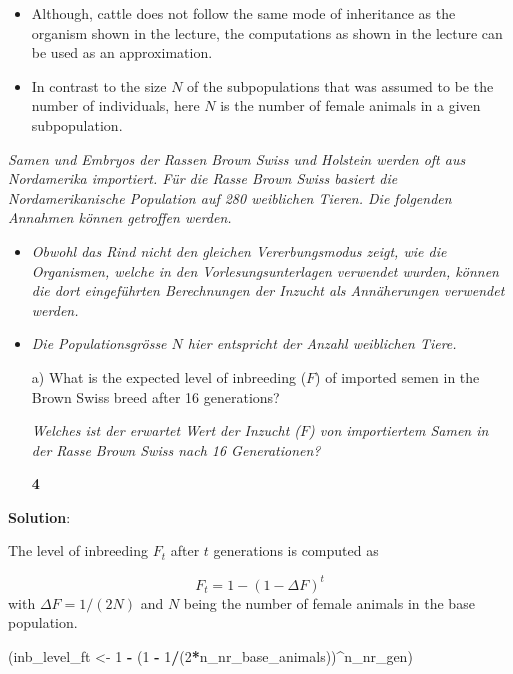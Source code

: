 \documentclass[
]{article}
\newenvironment{Shaded}{\begin{snugshade}}{\end{snugshade}}
\newcommand{\DecValTok}[1]{\textcolor[rgb]{0.00,0.00,0.81}{#1}}
\newcommand{\NormalTok}[1]{#1}
\newcommand{\OperatorTok}[1]{\textcolor[rgb]{0.81,0.36,0.00}{\textbf{#1}}}
\newcommand{\StringTok}[1]{\textcolor[rgb]{0.31,0.60,0.02}{#1}}
\providecommand{\tightlist}{%
  \setlength{\itemsep}{0pt}\setlength{\parskip}{0pt}}
\newcommand{\points}[1]
{\begin{flushright}\textbf{#1}\end{flushright}}
\newcommand{\solstart}
{\vspace{3ex}\textbf{Solution}:}
\begin{document}
\begin{itemize}
\tightlist
\item
  Although, cattle does not follow the same mode of inheritance as the
  organism shown in the lecture, the computations as shown in the
  lecture can be used as an approximation.
\item
  In contrast to the size \(N\) of the subpopulations that was assumed
  to be the number of individuals, here \(N\) is the number of female
  animals in a given subpopulation.
\end{itemize}

\textit{Samen und Embryos der Rassen Brown Swiss und Holstein werden oft aus Nordamerika importiert. Für die Rasse Brown Swiss basiert die Nordamerikanische Population auf 280 weiblichen Tieren. Die folgenden Annahmen können getroffen werden.}

\begin{itemize}
\tightlist
\item
  \textit{Obwohl das Rind nicht den gleichen Vererbungsmodus zeigt, wie die Organismen, welche in den Vorlesungsunterlagen verwendet wurden, können die dort eingeführten Berechnungen der Inzucht als Annäherungen verwendet werden.}
\item
  \textit{Die Populationsgrösse $N$ hier entspricht der Anzahl weiblichen Tiere.}
\end{itemize}

\vspace{3ex}
\begin{enumerate}
\item[a)] What is the expected level of inbreeding ($F$) of imported semen in the Brown Swiss breed after 16 generations?

\textit{Welches ist der erwartet Wert der Inzucht ($F$) von importiertem Samen in der Rasse Brown Swiss nach 16 Generationen?}
\points{4}
\end{enumerate}

\solstart

The level of inbreeding \(F_t\) after \(t\) generations is computed as

\[F_t = 1 - (1 - \Delta F)^t\] with \(\Delta F = 1/(2N)\) and \(N\)
being the number of female animals in the base population.

\begin{Shaded}
\begin{Highlighting}[]
\NormalTok{(inb_level_ft <-}\StringTok{ }\DecValTok{1} \OperatorTok{-}\StringTok{ }\NormalTok{(}\DecValTok{1} \OperatorTok{-}\StringTok{ }\DecValTok{1}\OperatorTok{/}\NormalTok{(}\DecValTok{2}\OperatorTok{*}\NormalTok{n_nr_base_animals))}\OperatorTok{^}\NormalTok{n_nr_gen)}
\end{Highlighting}
\end{Shaded}
\end{document}
